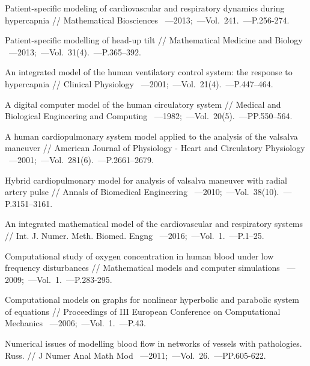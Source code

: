 \begin{thebibliography}{}
     Patient-specific modeling of cardiovascular and respiratory
dynamics during hypercapnia // Mathematical Biosciences ~---2013;~---Vol.~241.~---P.256-274.

     Patient-specific modelling of head-up
tilt // Mathematical Medicine and Biology ~---2013;~---Vol.~31(4).~---P.365–392.

     An integrated model of the human ventilatory control system: the response to
hypercapnia // Clinical Physiology ~---2001;~---Vol.~21(4).~---P.447–464.

     A digital computer model of the human circulatory system // Medical and Biological
Engineering and Computing ~---1982;~---Vol.~20(5).~---PP.550–564.

     A human cardiopulmonary system model applied to the analysis
of the valsalva maneuver // American Journal of Physiology - Heart and Circulatory Physiology ~---2001;~---Vol.~281(6).~---P.2661–2679.

     Hybrid cardiopulmonary model for analysis of valsalva maneuver with
radial artery pulse // Annals of Biomedical Engineering ~---2010;~---Vol.~38(10).~---P.3151–3161.

     An integrated mathematical model of the cardiovascular and
respiratory systems // Int. J. Numer. Meth. Biomed. Engng ~---2016;~---Vol.~1.~---P.1–25.

     Computational study of oxygen concentration in human blood under low frequency disturbances // Mathematical models and computer simulations ~---2009;~---Vol.~1.~---P.283-295.
    
      Computational models on graphs for nonlinear hyperbolic and parabolic system of equations // Proceedings of III European Conference on Computational Mechanics ~---2006;~---Vol.~1.~---P.43.
    
      Numerical issues of modelling blood flow in networks of vessels with pathologies. Russ. // J Numer Anal Math Mod ~---2011;~---Vol.~26.~---PP.605-622.
    

\end{thebibliography}
